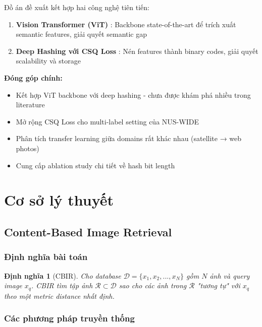 \documentclass[12pt,a4paper]{article}
\newtheorem{definition}{Định nghĩa}[section]
\begin{document}
Đồ án đề xuất kết hợp hai công nghệ tiên tiến:

\begin{enumerate}
    \item \textbf{Vision Transformer (ViT)} \cite{dosovitskiy2021vit}: Backbone state-of-the-art để trích xuất semantic features, giải quyết semantic gap
    \item \textbf{Deep Hashing với CSQ Loss} \cite{yuan2020csq}: Nén features thành binary codes, giải quyết scalability và storage
\end{enumerate}

\textbf{Đóng góp chính:}
\begin{itemize}
    \item Kết hợp ViT backbone với deep hashing - chưa được khám phá nhiều trong literature
    \item Mở rộng CSQ Loss cho multi-label setting của NUS-WIDE
    \item Phân tích transfer learning giữa domains rất khác nhau (satellite → web photos)
    \item Cung cấp ablation study chi tiết về hash bit length
\end{itemize}

\section{Cơ sở lý thuyết}

\subsection{Content-Based Image Retrieval}

\subsubsection{Định nghĩa bài toán}

\begin{definition}[CBIR]
Cho database $\mathcal{D} = \{x_1, x_2, ..., x_N\}$ gồm $N$ ảnh và query image $x_q$. CBIR tìm tập ảnh $\mathcal{R} \subset \mathcal{D}$ sao cho các ảnh trong $\mathcal{R}$ "tương tự" với $x_q$ theo một metric distance nhất định.
\end{definition}

\subsubsection{Các phương pháp truyền thống}
\end{document}
